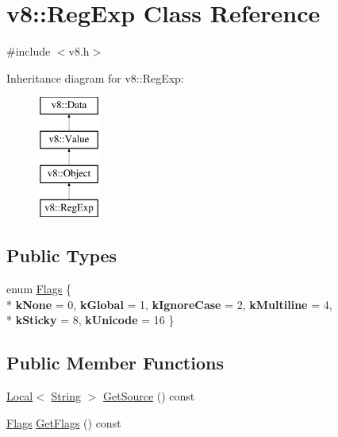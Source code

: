 \hypertarget{classv8_1_1RegExp}{}\section{v8\+:\+:Reg\+Exp Class Reference}
\label{classv8_1_1RegExp}


{\ttfamily \#include $<$v8.\+h$>$}

Inheritance diagram for v8\+:\+:Reg\+Exp\+:\begin{figure}[H]
\begin{center}
\leavevmode
\includegraphics[height=4.000000cm]{classv8_1_1RegExp}
\end{center}
\end{figure}
\subsection*{Public Types}
\begin{DoxyCompactItemize}
\item 
enum \hyperlink{classv8_1_1RegExp_aa4718a5c1f18472aff3bf51ed694fc5a}{Flags} \{ \\*
{\bfseries k\+None} = 0, 
{\bfseries k\+Global} = 1, 
{\bfseries k\+Ignore\+Case} = 2, 
{\bfseries k\+Multiline} = 4, 
\\*
{\bfseries k\+Sticky} = 8, 
{\bfseries k\+Unicode} = 16
 \}
\end{DoxyCompactItemize}
\subsection*{Public Member Functions}
\begin{DoxyCompactItemize}
\item 
\hyperlink{classv8_1_1Local}{Local}$<$ \hyperlink{classv8_1_1String}{String} $>$ \hyperlink{classv8_1_1RegExp_a448213f2a92d964ed260b51429d5e590}{Get\+Source} () const 
\item 
\hyperlink{classv8_1_1RegExp_aa4718a5c1f18472aff3bf51ed694fc5a}{Flags} \hyperlink{classv8_1_1RegExp_ad5a5e77e6e626b3c7c69eef7ba2908cc}{Get\+Flags} () const 
\end{DoxyCompactItemize}
